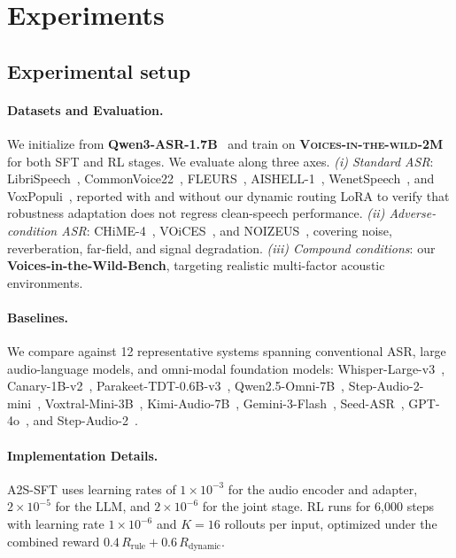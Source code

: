 \documentclass{article}
\begin{document}
\vspace*{-6mm}
\section{\vspace{-2mm}Experiments}
\vspace{-1mm}
\subsection{Experimental setup}
\vspace{-2mm}

\paragraph{Datasets and Evaluation.}
We initialize from \textbf{Qwen3-ASR-1.7B}~\citep{qwen3-asr} and train on \textbf{ \textsc{Voices-in-the-wild-2M} } for both SFT and RL 
stages. We evaluate along three axes. \textit{(i) Standard ASR}: 
LibriSpeech~\citep{librispeech}, CommonVoice22~\citep{commonvoice}, FLEURS~\citep{fleurs}, 
AISHELL-1~\citep{aishell}, WenetSpeech~\citep{wenetspeech}, and VoxPopuli~\citep{voxpopuli}, 
reported with and without our dynamic routing LoRA to verify that 
robustness adaptation does not regress clean-speech performance. 
\textit{(ii) Adverse-condition ASR}: CHiME-4~\citep{CHIME4}, 
VOiCES~\citep{VOICES}, and NOIZEUS~\citep{Noizeus}, covering noise, reverberation, 
far-field, and signal degradation. \textit{(iii) Compound conditions}: 
our \textbf{Voices-in-the-Wild-Bench}, targeting realistic multi-factor 
acoustic environments.

\vspace{-2mm}

\paragraph{Baselines.}
We compare against 12 representative systems spanning conventional ASR, 
large audio-language models, and omni-modal foundation models: 
Whisper-Large-v3~\citep{whisper}, Canary-1B-v2~\citep{canary&parakeet}, 
Parakeet-TDT-0.6B-v3~\citep{canary&parakeet}, 
Qwen2.5-Omni-7B~\citep{qwen2.5omni}, Step-Audio-2-mini~\citep{stepaudio2}, Voxtral-Mini-3B~\citep{voxtral}, Kimi-Audio-7B~\citep{Kimi-Audio}, Gemini-3-Flash~\citep{}, Seed-ASR~\citep{seedasr}, 
GPT-4o~\citep{gpt-4o}, and Step-Audio-2~\citep{stepaudio2}.

\paragraph{Implementation Details.}
A2S-SFT uses learning rates of $1{\times}10^{-3}$ for the audio encoder 
and adapter, $2{\times}10^{-5}$ for the LLM, and $2{\times}10^{-6}$ for 
the joint stage. RL runs for 6{,}000 steps with learning rate 
$1{\times}10^{-6}$ and $K{=}16$ rollouts per input, optimized under the 
combined reward  $0.4\,R_\text{rule} + 0.6\,R_\text{dynamic}$. 
\end{document}
